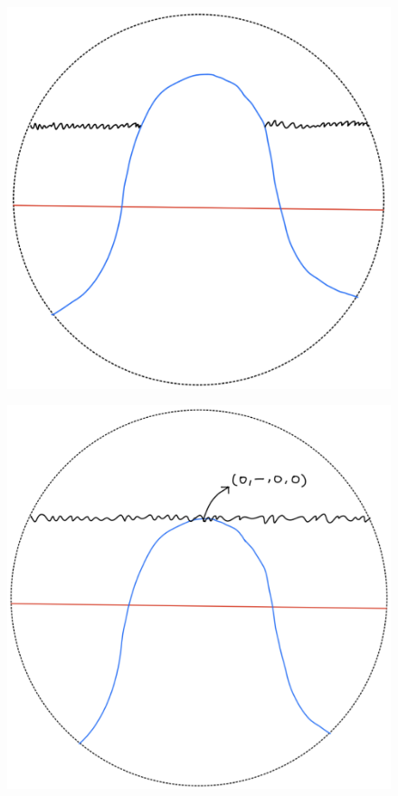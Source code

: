 \begin{definition}
\begin{enumerate}
\begin{itemize}
\begin{figure}[H]
    \centering
    \includegraphics[scale = 0.95]{diagrams/lemma2/22.png} 
    \caption{}
    \label{fig:your-label}
\end{figure}
\begin{figure}[H]
    \centering
    \includegraphics[scale = 0.95]{diagrams/lemma2/23.png} 

\end{figure}
\end{itemize}
\end{enumerate}
\end{definition}
